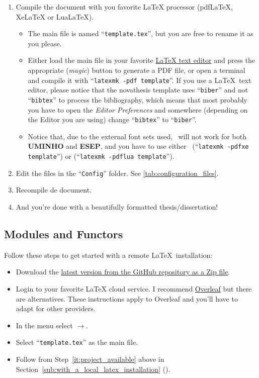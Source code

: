\begin{enumerate}
  \item Compile the document with you favorite LaTeX processor (pdfLaTeX, XeLaTeX or LuaLaTeX).
  \begin{itemize}
    \item The main file is named “\verb!template.tex!”, but you are free to rename it as you please.
    \item Either load the main file in your favorite \href{https://en.wikipedia.org/wiki/Comparison_of_TeX_editors}{LaTeX text editor} and press the appropriate (\emph{magic}) button to generate a PDF file, or open a terminal and compile it with “\verb!latexmk -pdf template!”. If you use a \LaTeX\ text editor, please notice that the \gls{novathesis} template uses “\verb!biber!” and not “\verb!bibtex!” to process the bibliography, which means that most probably you have to open the \emph{Editor Preferences} and somewhere (depending on the Editor you are using) change “\verb!bibtex!” to “\verb!biber!”.
    \item Notice that, due to the external font sets used, \pdfLaTeX\ will not work for both \textbf{UMINHO} and \textbf{ESEP}, and you have to use either \XeLaTeX\ (“\verb!latexmk -pdfxe template!”) or \LuaLaTeX (“\verb!latexmk -pdflua template!”).
  \end{itemize}
  \item Edit the files in the “\texttt{Config}” folder.  See \autoref{tab:configuration_files}.
  \item Recompile de document.
  \item And you're done with a beautifully formatted thesis/dissertation! {\setlength{\twemojiDefaultHeight}{1.5\twemojiDefaultHeight}\emojiSmile}
\end{enumerate}


\subsection{Modules and Functors} %
\label{sub:modules_and_functors}

Follow these steps to get started with a remote \LaTeX\ installation:

\begin{itemize}
  \item Download the \href{https://github.com/joaomlourenco/novathesis/archive/main.zip}{latest version from the GitHub repository as a Zip file}.
  \item Login to your favorite LaTeX cloud service. I recommend \href{https://www.overleaf.com/?r=f5160636&rm=d&rs=b}{Overleaf} but there are alternatives. These instructions apply to Overleaf and you'll have to adapt for other providers.
  \item In the menu select $\rightarrow$.
  \item Select “\verb!template.tex!” as the main file.
  \item Follow from Step~\ref{it:project_available} above in Section~\ref{sub:with_a_local_latex_installation} ().
\end{itemize}

